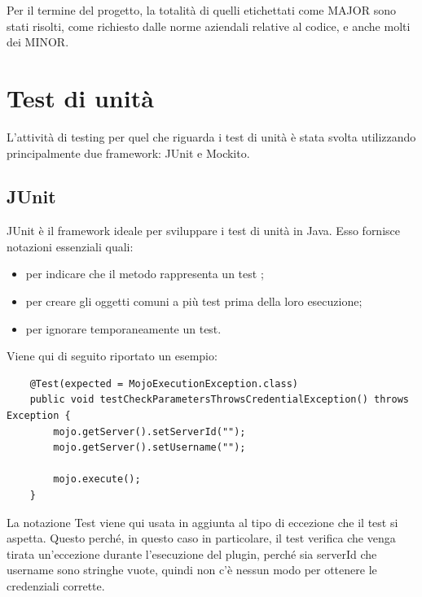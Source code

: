 Per il termine del progetto, la totalità di quelli etichettati come MAJOR sono stati risolti, come richiesto dalle norme aziendali relative al codice, e anche molti dei MINOR.
 

\section{Test di unità}

L'attività di testing per quel che riguarda i test di unità è stata svolta utilizzando principalmente due framework: JUnit e Mockito.

    \subsection{JUnit}
    JUnit è il framework ideale per sviluppare i test di unità in Java.
    Esso fornisce notazioni \cite{site:junit-annotation} essenziali quali:
    \begin{itemize}
        \item {} per indicare che il metodo rappresenta un test \cite{site:junit-test};
        \item {} per creare gli oggetti comuni a più test prima della loro esecuzione;
        \item {} per ignorare temporaneamente un test.
    \end{itemize}
    
    Viene qui di seguito riportato un esempio:
    \begin{lstlisting} 
    @Test(expected = MojoExecutionException.class)
    public void testCheckParametersThrowsCredentialException() throws Exception {
        mojo.getServer().setServerId("");
        mojo.getServer().setUsername("");

        mojo.execute();
    }
    \end{lstlisting}
    La notazione Test viene qui usata in aggiunta al tipo di eccezione che il test si aspetta.
    Questo perché, in questo caso in particolare, il test verifica che venga tirata un'eccezione durante l'esecuzione del plugin, perché sia serverId che username sono stringhe vuote, quindi non c'è nessun modo per ottenere le credenziali corrette. \\

